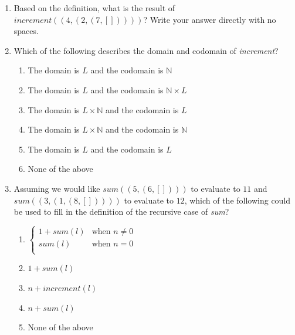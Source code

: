 \documentclass[12pt, oneside]{article}
\begin{document}
\begin{enumerate}
    \item Based on the definition, what is the result of $\textit{increment}((4, (2, (7, []))))$? Write your answer directly with no spaces.
    
    \item Which of the following describes the domain and codomain of \textit{increment}?
    
    \begin{multicols}{2}
    \begin{enumerate}
        \item The domain is $L$ and the codomain is $\mathbb{N}$
        \item The domain is $L$ and the codomain is $\mathbb{N} \times L$
        \item The domain is $L \times \mathbb{N}$ and the codomain is $L$
        \item The domain is $L \times \mathbb{N}$ and the codomain is $\mathbb{N}$
        \item The domain is $L$ and the codomain is $L$
        \item None of the above
    \end{enumerate}
    \end{multicols}
    
    \item Assuming we would like $sum((5, (6, [])))$ to evaluate to $11$ and $sum((3, (1, (8, []))))$ to evaluate to $12$, which of the following could be used to fill in the definition of the recursive case of \textit{sum}?
    
     \begin{multicols}{2}
    \begin{enumerate}
        \item $\begin{cases}
            1 + \textit{sum}(l) & \textrm{when } n \neq 0 \\
            \textit{sum}(l) & \textrm{when } n = 0 \\
        \end{cases}$
        \item $1 + \textit{sum}(l)$
        \item $n + \textit{increment}(l)$
        \item $n + \textit{sum}(l)$
        \item None of the above
    \end{enumerate}
    \end{multicols}
    

\end{enumerate}
\end{document}
